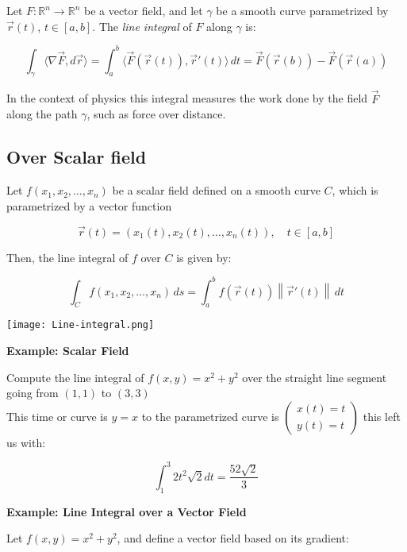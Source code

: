 Let \( F : \mathbb{R}^n \to \mathbb{R}^n \) be a vector field, and let \( \gamma \) be a smooth curve parametrized by \( \vec{r}(t) \), \( t \in [a, b] \). The \emph{line integral} of \( F \) 
along \( \gamma \) is:

\[
\int_\gamma \langle \nabla \vec{F}, d\vec{r} \rangle = \int_a^b \langle \vec{F}(\vec{r}(t)), \vec{r}'(t) \rangle \, dt = \vec{F}(\vec{r}(b)) - \vec{F}(\vec{r}(a))
\]

In the context of physics this integral measures the work done by the field \( \vec{F} \) along the path \( \gamma \), such as force over distance.

\subsection{Over Scalar field}

Let \( f(x_1, x_2, \ldots, x_n) \) be a scalar field defined on a smooth curve \( C \), which 
is parametrized by a vector function

\[
\vec{r}(t) = (x_1(t), x_2(t), \ldots, x_n(t)), \quad t \in [a, b]
\]

Then, the line integral of \( f \) over \( C \) is given by:

\[
\int_C f(x_1, x_2, \ldots, x_n) \, ds = \int_a^b f(\vec{r}(t)) \left\| \vec{r}'(t) \right\| \, dt
\]


\begin{center}
    \texttt{[image: Line-integral.png]}
\end{center}

\textbf{Example: Scalar Field}
\vspace{\baselineskip}

Compute the line integral of \(f(x,y) = x^2 + y^2\) over the straight line segment going
from \((1,1)\) to \((3,3)\)
\\
This time or curve is \(y = x\) to the parametrized curve is \(\begin{pmatrix}
    x(t) = t \\ y(t) = t
\end{pmatrix}\) this left us with:

\[
\int_{1}^{3}  2t^2 \sqrt{2}dt = \frac{52\sqrt{2}}{3} 
\]

\textbf{Example: Line Integral over a Vector Field}
\vspace{\baselineskip}

Let \( f(x, y) = x^2 + y^2 \), and define a vector field based on its gradient:

